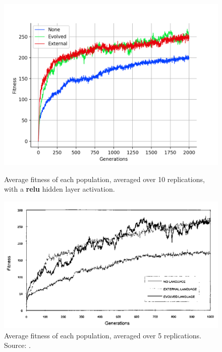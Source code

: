 \documentclass[12pt,a4paper,twoside,openright]{report}
\begin{document}
\begin{figure}[t]
   \centering
   \begin{minipage}{0.49\textwidth}
          \centering
          \captionsetup{width=.9\linewidth}
          \includegraphics[width=1.\linewidth]{results/average-relu.png}
          \caption{Average fitness of each population, averaged over 10 replications, with a {\bf relu} hidden layer activation.}
          \label{fig:average-relu}
   \end{minipage}
   \begin{minipage}{0.49\textwidth}
          \centering
          \captionsetup{width=.9\linewidth}
          \includegraphics[width=1.\linewidth]{figs/fitness.png}
          \caption{Average fitness of each population, averaged over 5 replications. Source: \citet{Cangelosi1998}.}
          \label{fig:cangelosi-results}
   \end{minipage}
\end{figure}
\end{document}
